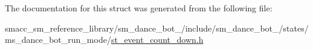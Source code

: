 The documentation for this struct was generated from the following file\+:\begin{DoxyCompactItemize}
\item 
smacc\+\_\+sm\+\_\+reference\+\_\+library/sm\+\_\+dance\+\_\+bot\+\_/include/sm\+\_\+dance\+\_\+bot\+\_/states/ms\+\_\+dance\+\_\+bot\+\_\+run\+\_\+mode/\hyperlink{sm__dance__bot__2_2include_2sm__dance__bot__2_2states_2ms__dance__bot__run__mode_2st__event__count__down_8h}{st\+\_\+event\+\_\+count\+\_\+down.\+h}\end{DoxyCompactItemize}
